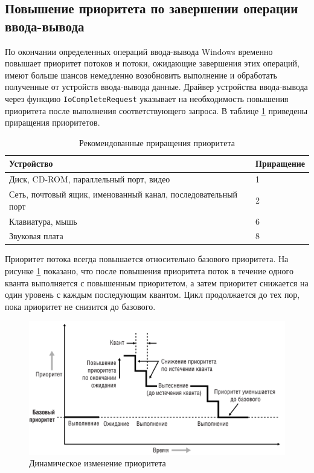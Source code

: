 \documentclass[a4paper,oneside,14pt]{extreport}
\newcommand{\code}[1]{\texttt{#1}}
\begin{document}
	\subsection{Повышение приоритета по завершении операции ввода-вывода}
	По окончании определенных операций ввода-вывода Windows временно повышает приоритет потоков и потоки, ожидающие завершения этих операций, имеют больше шансов немедленно возобновить выполнение и обработать полученные от устройств ввода-вывода данные.
	Драйвер устройства ввода-вывода через функцию \code{IoCompleteRequest} указывает на необходимость повышения приоритета после выполнения соответствующего запроса.
	В таблице \ref{tbl:priorityinc} приведены приращения приоритетов.
	\begin{table}[H]
		\begin{center}
			\begin{tabular}{|p{100mm}|l|} 
				\hline
				Устройство & Приращение \\	
				\hline
				Диск, CD-ROM, параллельный порт, видео & 1 \\
				\hline
				Сеть, почтовый ящик, именованный канал, последовательный порт & 2 \\
				\hline
				Клавиатура, мышь & 6 \\
				\hline
				Звуковая плата & 8 \\
				\hline
			\end{tabular}
		\end{center}
		\caption{Рекомендованные приращения приоритета}
		\label{tbl:priorityinc}
	\end{table}
	Приоритет потока всегда повышается относительно базового приоритета. На рисунке \ref{fig:dp} показано, что после повышения приоритета поток в течение одного кванта выполняется с повышенным приоритетом, а затем приоритет снижается на один уровень с каждым последующим квантом. Цикл продолжается до тех пор, пока приоритет не снизится до базового.
	\begin{figure}[H]
		\centering
		\includegraphics[scale=0.3]{images/priority}
		\caption{Динамическое изменение приоритета}
		\label{fig:dp}
	\end{figure}
\end{document}
